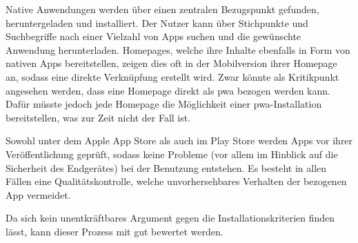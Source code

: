  Native Anwendungen werden über einen zentralen Bezugspunkt gefunden, heruntergeladen und installiert. Der Nutzer kann über Stichpunkte und Suchbegriffe nach einer Vielzahl von Apps suchen und die gewünschte Anwendung herunterladen. Homepages, welche ihre Inhalte ebenfalls in Form von nativen Apps bereitstellen, zeigen dies oft in der Mobilversion ihrer Homepage an, sodass eine direkte Verknüpfung erstellt wird. Zwar könnte als Kritikpunkt angesehen werden, dass eine Homepage direkt als \ac{pwa} bezogen werden kann. Dafür müsste jedoch jede Homepage die Möglichkeit einer \ac{pwa}-Installation bereitstellen, was zur Zeit nicht der Fall ist.
 
 Sowohl unter dem Apple App Store als auch im Play Store werden Apps vor ihrer Veröffentlichung geprüft, sodass keine Probleme (vor allem im Hinblick auf die Sicherheit des Endgerätes) bei der Benutzung entstehen. Es besteht in allen Fällen eine Qualitätskontrolle, welche unvorhersehbares Verhalten der bezogenen App vermeidet.
 
 Da sich kein unentkräftbares Argument gegen die Installationskriterien finden lässt, kann dieser Prozess mit gut bewertet werden.